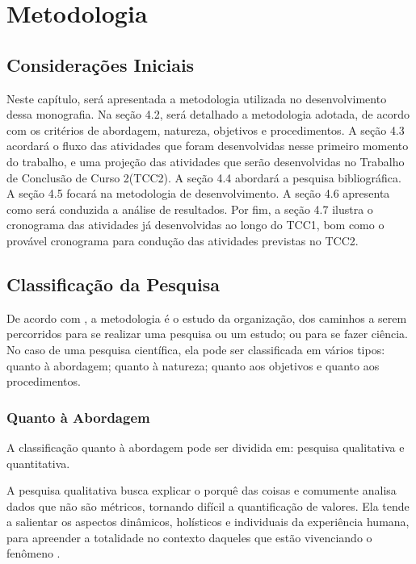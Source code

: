 \chapter[Metodologia]{Metodologia}
\label{ch:metodologia}

\section{Considerações Iniciais}

Neste capítulo, será apresentada a metodologia utilizada no desenvolvimento dessa 
monografia. Na seção 4.2, será detalhado a metodologia adotada, de acordo com os 
critérios de abordagem, natureza, objetivos e procedimentos. A seção 4.3 acordará o fluxo 
das atividades que foram desenvolvidas nesse primeiro momento do trabalho, e uma projeção das atividades 
que serão desenvolvidas no Trabalho de Conclusão de Curso 2(TCC2). A seção 4.4 abordará a pesquisa bibliográfica.
A seção 4.5 focará na metodologia de desenvolvimento. A seção 4.6 apresenta como será conduzida a análise de resultados. 
Por fim, a seção 4.7 ilustra 
o cronograma das atividades já desenvolvidas ao longo do TCC1, bom como o provável cronograma para 
condução das atividades previstas no TCC2.


\section{Classificação da Pesquisa}

De acordo com , a metodologia é o estudo da organização, dos 
caminhos a serem percorridos para se realizar uma pesquisa ou um estudo; ou para se 
fazer ciência. No caso de uma pesquisa científica, ela pode ser classificada em 
vários tipos: quanto à abordagem; quanto à natureza; quanto aos objetivos e quanto aos procedimentos.

\subsection{Quanto à Abordagem}

A classificação quanto à abordagem pode ser dividida em: pesquisa qualitativa e quantitativa. 

A pesquisa qualitativa busca explicar o porquê das coisas e 
comumente analisa dados que não são métricos, tornando difícil 
a quantificação de valores. Ela tende a salientar os
aspectos dinâmicos, holísticos e individuais da experiência humana, para apreender
a totalidade no contexto daqueles que estão vivenciando o fenômeno \cite{gerhardt2009}.

